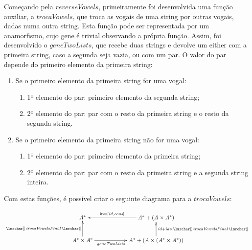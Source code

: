 \documentclass[11pt, a4paper, fleqn]{article}
\newcommand{\Conid}[1]{\mathit{#1}}
\newcommand{\Varid}[1]{\mathit{#1}}
\begin{document}
Começando pela $reverseVowels$, primeiramente foi desenvolvida uma função auxiliar, a $trocaVowels$, que troca as vogais de uma string por outras vogais,
 dadas numa outra string. Esta função pode ser representada por um anamorfismo, cujo gene é trivial observando a própria função.
Assim, foi desenvolvido o $geneTwoLists$, que recebe duas strings e devolve um either com a primeira string, caso a segunda seja vazia, ou com um par. O valor do par depende do primeiro elemento da primeira string:
\begin{enumerate}
    \item Se o primeiro elemento da primeira string for uma vogal:
        \begin{enumerate}
            \item 1º elemento do par: primeiro elemento da segunda string;
            \item 2º elemento do par: par com o resto da primeira string e o resto da segunda string.
        \end{enumerate}    
    \item Se o primeiro elemento da primeira string não for uma vogal:
        \begin{enumerate}
            \item 1º elemento do par: primeiro elemento da primeira string;
            \item 2º elemento do par: par com o resto da primeira string e a segunda string inteira.
        \end{enumerate}
\end{enumerate}

Com estas funções, é possível criar o seguinte diagrama para a $trocaVowels$:    

\begin{eqnarray*}
\xymatrix@C=2cm{
        \ensuremath{\Conid{A}}^*
&
        \ensuremath{\Conid{A}}^* \ensuremath{\mathbin{+}(\Conid{A}\times} \ensuremath{\Conid{A}}^* \ensuremath{)}
            \ar[l]_-{\ensuremath{\mathbf{in}\mathrel{=}\alt{\Varid{id}}{\Varid{cons}}}}
\\
    \ensuremath{\Conid{A}}^* \ensuremath{\times} \ensuremath{\Conid{A}}^* 
           \ar[u]^-{\ensuremath{\anaList{\Varid{trocaVowelsFinal}}}}
           \ar[r]_-{\ensuremath{\Varid{geneTwoLists}}}
&
    \ensuremath{\Conid{A}}^* \ensuremath{\mathbin{+}(\Conid{A}\times(} \ensuremath{\Conid{A}}^* \ensuremath{\times} \ensuremath{\Conid{A}}^* \ensuremath{))}
           \ar[u]_{\ensuremath{\Varid{id}\mathbin{+}\Varid{id}\times\anaList{\Varid{trocaVowelsFinal}}}}
    }
\end{eqnarray*}
\end{document}

